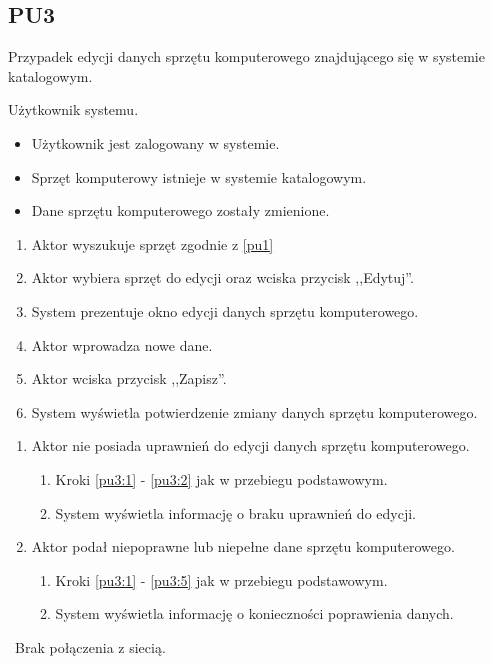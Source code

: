\subsection{PU3}

Przypadek edycji danych sprzętu komputerowego znajdującego się w systemie katalogowym.

Użytkownik systemu.

\begin{itemize}
\item Użytkownik jest zalogowany w systemie.
\item Sprzęt komputerowy istnieje w systemie katalogowym.
\end{itemize}

\begin{itemize}
\item Dane sprzętu komputerowego zostały zmienione.
\end{itemize}

\begin{enumerate}
\item \label{pu3:1} Aktor wyszukuje sprzęt zgodnie z \ref{pu1}
\item \label{pu3:2} Aktor wybiera sprzęt do edycji oraz wciska przycisk ,,Edytuj''.
\item System prezentuje okno edycji danych sprzętu komputerowego.
\item Aktor wprowadza nowe dane.
\item \label{pu3:5} Aktor wciska przycisk ,,Zapisz''.
\item System wyświetla potwierdzenie zmiany danych sprzętu komputerowego.
\end{enumerate}

\begin{enumerate}
\item Aktor nie posiada uprawnień do edycji danych sprzętu komputerowego.
	\begin{enumerate}[label*=\arabic*.]
		\item Kroki \ref{pu3:1} - \ref{pu3:2} jak w przebiegu podstawowym.
		\item System wyświetla informację o braku uprawnień do edycji.
	\end{enumerate}
\item Aktor podał niepoprawne lub niepełne dane sprzętu komputerowego.
	\begin{enumerate}[label*=\arabic*.]
		\item Kroki \ref{pu3:1} - \ref{pu3:5} jak w przebiegu podstawowym.
		\item System wyświetla informację o konieczności poprawienia danych.
	\end{enumerate}
\end{enumerate}

\
Brak połączenia z siecią.